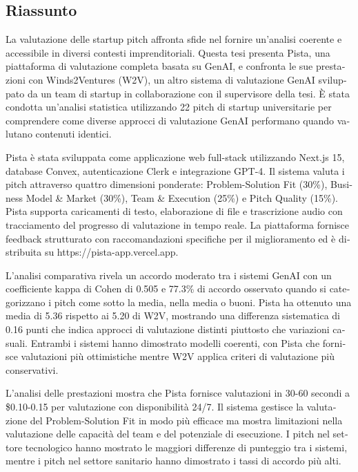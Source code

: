 \begin{otherlanguage}{italian}
\chapter*{Riassunto}

La valutazione delle startup pitch affronta sfide nel fornire un'analisi coerente e accessibile in diversi contesti imprenditoriali. Questa tesi presenta Pista, una piattaforma di valutazione completa basata su GenAI, e confronta le sue prestazioni con Winds2Ventures (W2V), un altro sistema di valutazione GenAI sviluppato da un team di startup in collaborazione con il supervisore della tesi. È stata condotta un'analisi statistica utilizzando 22 pitch di startup universitarie per comprendere come diverse approcci di valutazione GenAI performano quando valutano contenuti identici.

Pista è stata sviluppata come applicazione web full-stack utilizzando Next.js 15, database Convex, autenticazione Clerk e integrazione GPT-4. Il sistema valuta i pitch attraverso quattro dimensioni ponderate: Problem-Solution Fit (30\%), Business Model \& Market (30\%), Team \& Execution (25\%) e Pitch Quality (15\%). Pista supporta caricamenti di testo, elaborazione di file e trascrizione audio con tracciamento del progresso di valutazione in tempo reale. La piattaforma fornisce feedback strutturato con raccomandazioni specifiche per il miglioramento ed è distribuita su https://pista-app.vercel.app.

L'analisi comparativa rivela un accordo moderato tra i sistemi GenAI con un coefficiente kappa di Cohen di 0.505 e 77.3\% di accordo osservato quando si categorizzano i pitch come sotto la media, nella media o buoni. Pista ha ottenuto una media di 5.36 rispetto ai 5.20 di W2V, mostrando una differenza sistematica di 0.16 punti che indica approcci di valutazione distinti piuttosto che variazioni casuali. Entrambi i sistemi hanno dimostrato modelli coerenti, con Pista che fornisce valutazioni più ottimistiche mentre W2V applica criteri di valutazione più conservativi.

L'analisi delle prestazioni mostra che Pista fornisce valutazioni in 30-60 secondi a \$0.10-0.15 per valutazione con disponibilità 24/7. Il sistema gestisce la valutazione del Problem-Solution Fit in modo più efficace ma mostra limitazioni nella valutazione delle capacità del team e del potenziale di esecuzione. I pitch nel settore tecnologico hanno mostrato le maggiori differenze di punteggio tra i sistemi, mentre i pitch nel settore sanitario hanno dimostrato i tassi di accordo più alti.


\end{otherlanguage}
